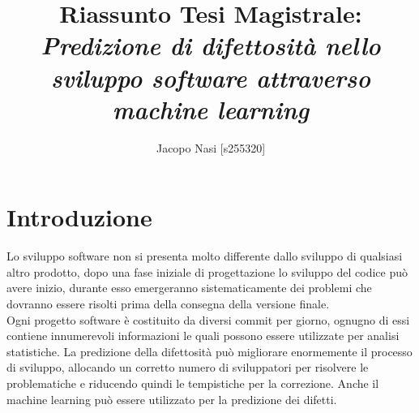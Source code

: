 \documentclass{article}
\begin{document}
\title{Riassunto Tesi Magistrale: \textit{Predizione di difettosità nello sviluppo software attraverso machine learning}}

\author{Jacopo Nasi [s255320]}

\maketitle

\section{Introduzione}
Lo sviluppo software non si presenta molto differente dallo sviluppo di qualsiasi altro prodotto, dopo una fase iniziale di progettazione lo sviluppo del codice può avere inizio, durante esso emergeranno sistematicamente dei problemi che dovranno essere risolti prima della consegna della versione finale.\\
Ogni progetto software è costituito da diversi commit per giorno, ognugno di essi contiene innumerevoli informazioni le quali possono essere utilizzate per analisi statistiche. La predizione della difettosità può migliorare enormemente il processo di sviluppo, allocando un corretto numero di sviluppatori per risolvere le problematiche e riducendo quindi le tempistiche per la correzione. Anche il machine learning può essere utilizzato per la predizione dei difetti.
\end{document}
